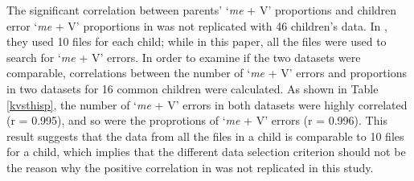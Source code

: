 The significant correlation between parents' `\textit{me} + V' proportions and children error `\textit{me} + V' proportions in \cite{kirjavainen2009can} was not replicated with 46 children's data. In \cite{kirjavainen2009can}, they used 10 files for each child; while in this paper, all the files were used to search for `\textit{me} + V' errors. In order to examine if the two datasets were comparable, correlations between the number of `\textit{me} + V' errors and proportions in two datasets for 16 common children were calculated. As shown in Table \ref{kvsthisp}, the number of `\textit{me} + V' errors in both datasets were highly correlated (r = 0.995), and so were the proprotions of `\textit{me} + V' errors (r = 0.996). This result suggests that the data from all the files in a child is comparable to 10 files for a child, which implies that the different data selection criterion should not be the reason why the positive correlation in \cite{kirjavainen2009can} was not replicated in this study. 
\FloatBarrier
